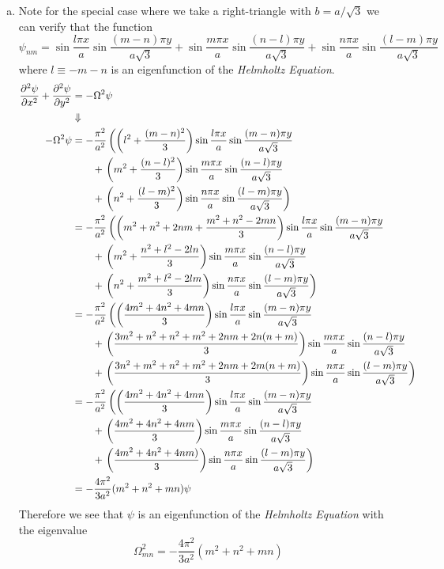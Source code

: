 \documentclass[11pt]{article}
\numberwithin{equation}{section}
\begin{document}
\begin{enumerate}[(a)]
\item
    Note for the special case where we take a right-triangle with $b=a/\sqrt{3}$ we can verify that the function
    $$\psi_{nm} = \sin\frac{l\pi{x}}{a}\sin\frac{(m-n)\pi{y}}{a\sqrt{3}}
    + \sin\frac{m\pi{x}}{a}\sin\frac{(n-l)\pi{y}}{a\sqrt{3}}
    + \sin\frac{n\pi{x}}{a}\sin\frac{(l-m)\pi{y}}{a\sqrt{3}}$$
    where $l\equiv{-m-n}$ is an eigenfunction of the \emph{Helmholtz Equation}.
    \begin{align*}
        \frac{\partial{^2\psi}}{\partial{x^2}} + \frac{\partial{^2\psi}}{\partial{y^2}} &= -\Omega^2\psi \\
                                                        &\Downarrow\\
        -\Omega^2\psi &= -\frac{\pi^2}{a^2}\left(\left(l^2+\frac{(m-n)^2}{3}\right)\sin\frac{l\pi{x}}{a}\sin\frac{(m-n)\pi{y}}{a\sqrt{3}}\right.\\
                      &\qquad+\left.\left(m^2+\frac{(n-l)^2}{3}\right)\sin\frac{m\pi{x}}{a}\sin\frac{(n-l)\pi{y}}{a\sqrt{3}}\right.\\
                      &\qquad+\left.\left(n^2+\frac{(l-m)^2}{3}\right)\sin\frac{n\pi{x}}{a}\sin\frac{(l-m)\pi{y}}{a\sqrt{3}}\right)\\
                      &= -\frac{\pi^2}{a^2}\left(\left(m^2+n^2+2nm+\frac{m^2+n^2-2mn}{3}\right)\sin\frac{l\pi{x}}{a}\sin\frac{(m-n)\pi{y}}{a\sqrt{3}}\right.\\
                      &\qquad+\left.\left(m^2+\frac{n^2+l^2-2ln}{3}\right)\sin\frac{m\pi{x}}{a}\sin\frac{(n-l)\pi{y}}{a\sqrt{3}}\right.\\
                      &\qquad+\left.\left(n^2+\frac{m^2+l^2-2lm}{3}\right)\sin\frac{n\pi{x}}{a}\sin\frac{(l-m)\pi{y}}{a\sqrt{3}}\right)\\
                      &= -\frac{\pi^2}{a^2}\left(\left(\frac{4m^2+4n^2+4mn}{3}\right)\sin\frac{l\pi{x}}{a}\sin\frac{(m-n)\pi{y}}{a\sqrt{3}}\right.\\
                      &\qquad+\left.\left(\frac{3m^2+n^2+n^2+m^2+2nm+2n(n+m)}{3}\right)\sin\frac{m\pi{x}}{a}\sin\frac{(n-l)\pi{y}}{a\sqrt{3}}\right.\\
                      &\qquad+\left.\left(\frac{3n^2+m^2+n^2+m^2+2nm+2m(n+m)}{3}\right)\sin\frac{n\pi{x}}{a}\sin\frac{(l-m)\pi{y}}{a\sqrt{3}}\right)\\
                      &= -\frac{\pi^2}{a^2}\left(\left(\frac{4m^2+4n^2+4mn}{3}\right)\sin\frac{l\pi{x}}{a}\sin\frac{(m-n)\pi{y}}{a\sqrt{3}}\right.\\
                      &\qquad+\left.\left(\frac{4m^2+4n^2+4nm}{3}\right)\sin\frac{m\pi{x}}{a}\sin\frac{(n-l)\pi{y}}{a\sqrt{3}}\right.\\
                      &\qquad+\left.\left(\frac{4m^2+4n^2+4nm)}{3}\right)\sin\frac{n\pi{x}}{a}\sin\frac{(l-m)\pi{y}}{a\sqrt{3}}\right)\\
                      &= -\frac{4\pi^2}{3a^2}(m^2+n^2+mn)\psi
    \end{align*}
    Therefore we see that $\psi$ is an eigenfunction of the \emph{Helmholtz Equation} with the eigenvalue
    $$\Omega^2_{mn} = -\frac{4\pi^2}{3a^2}(m^2+n^2+mn)$$


\end{enumerate}
\end{document}
